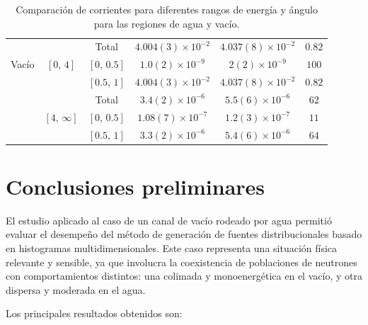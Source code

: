 \begin{table}[h]
{\begin{tabular}{|c|c|c|c|c|c|}
                &                   & Total         & $4.004(3)\times 10^{-2}$  & $4.037(8)\times 10^{-2}$  & $0.82$    \\       
        Vacío   & $[0,\,4]$         & $[0,\,0.5]$   & $1.0(2)\times 10^{-9}$    & $2(2)\times 10^{-9}$      & $100$     \\       
                &                   & $[0.5,\,1]$   & $4.004(3)\times 10^{-2}$  & $4.037(8)\times 10^{-2}$  & $0.82$    \\       
                &                   & Total         & $3.4(2)\times 10^{-6}$    & $5.5(6)\times 10^{-6}$    & $62$      \\       
                & $[4,\,\infty]$    & $[0,\,0.5]$   & $1.08(7)\times 10^{-7}$   & $1.2(3)\times 10^{-7}$    & $11$      \\      
                &                   & $[0.5,\,1]$   & $3.3(2)\times 10^{-6}$    & $5.4(6)\times 10^{-6}$    & $64$      \\
        \hline
    \end{tabular}
    }
\caption{Comparación de corrientes para diferentes rangos de energía y ángulo para las regiones de agua y vacío.}
\label{tab:comparacion_corriente}
\end{table}




\section{Conclusiones preliminares}

El estudio aplicado al caso de un canal de vacío rodeado por agua permitió evaluar el desempeño del método de generación de fuentes distribucionales basado en histogramas multidimensionales. Este caso representa una situación física relevante y sensible, ya que involucra la coexistencia de poblaciones de neutrones con comportamientos distintos: una colimada y monoenergética en el vacío, y otra dispersa y moderada en el agua.

Los principales resultados obtenidos son:

